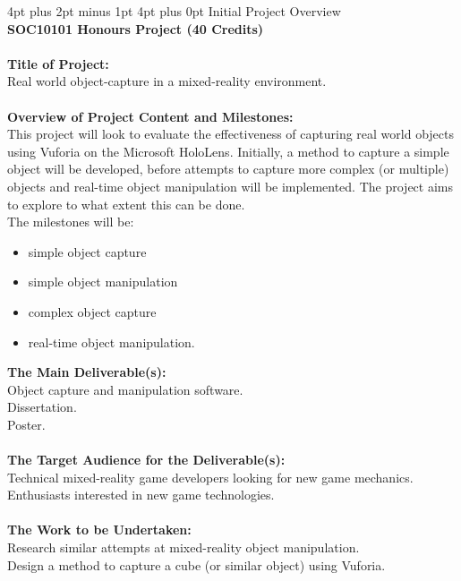 \documentclass[12pt,a4paper,oneside]{article}
\makeatletter
\renewcommand\section{\@startsection {section}{1}{0mm} %
                               {4pt plus 2pt minus 1pt} %
                               {4pt plus 0pt} %
                               {\Large\bfseries}}
\makeatother
\begin{document}
\newpage
\begin{appendices}
\section{Initial Project Overview}
 \ \\ \textbf{SOC10101 Honours Project (40 Credits)} \\ \\
\textbf{Title of Project:} \\
Real world object-capture in a mixed-reality environment. \\ \\
\textbf{Overview of Project Content and Milestones:} \\
This project will look to evaluate the effectiveness of capturing real world objects using Vuforia on the Microsoft HoloLens. Initially, a method to capture a simple object will be developed, before attempts to capture more complex (or multiple) objects and real-time object manipulation will be implemented. The project aims to explore to what extent this can be done. \\
The milestones will be: 
\begin{itemize}\itemsep0pt
	\item simple object capture
	\item simple object manipulation
	\item complex object capture
	\item real-time object manipulation.
\end{itemize}
\textbf{The Main Deliverable(s):} \\
Object capture and manipulation software. \\
Dissertation. \\
Poster. \\ \\
\textbf{The Target Audience for the Deliverable(s):} \\
Technical mixed-reality game developers looking for new game mechanics. \\
Enthusiasts interested in new game technologies. \\ \\
\textbf{The Work to be Undertaken:} \\
Research similar attempts at mixed-reality object manipulation. \\
Design a method to capture a cube (or similar object) using Vuforia. \\

\end{appendices}
\end{document}
